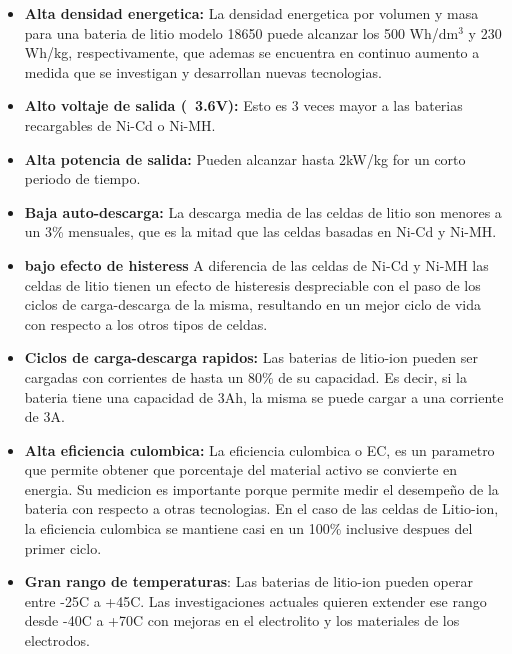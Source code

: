 \documentclass[10pt,a4paper]{article}
\begin{document}
	\begin{itemize}
        \item \textbf{Alta densidad energetica:} La densidad energetica por
            volumen y masa para una bateria de litio modelo 18650 puede alcanzar
            los 500 Wh/$\mathrm{dm^3}$ y 230 Wh/kg, respectivamente, que ademas
            se encuentra en continuo aumento a medida que se investigan y
            desarrollan nuevas tecnologias.
        \item \textbf{Alto voltaje de salida (~3.6V):} Esto es 3 veces mayor a
            las baterias recargables de Ni-Cd o Ni-MH.
        \item \textbf{Alta potencia de salida:} Pueden alcanzar hasta 2kW/kg for
            un corto periodo de tiempo.
        \item \textbf{Baja auto-descarga:} La descarga media de las celdas de
            litio son menores a un 3\% mensuales, que es la mitad que las celdas
            basadas en Ni-Cd y Ni-MH.
        \item \textbf{bajo efecto de histeress} A diferencia de las celdas de
            Ni-Cd y Ni-MH las celdas de litio tienen un efecto de histeresis
            despreciable con el paso de los ciclos de carga-descarga de la
            misma, resultando en un mejor ciclo de vida con respecto a los otros
            tipos de celdas.
        \item \textbf{Ciclos de carga-descarga rapidos:} Las baterias de
            litio-ion pueden ser cargadas con corrientes de hasta un 80\% de su
            capacidad. Es decir, si la bateria tiene una capacidad de 3Ah, la
            misma se puede cargar a una corriente de 3A.
        \item \textbf{Alta eficiencia culombica:} La eficiencia culombica o EC,
            es un parametro que permite obtener que porcentaje del material
            activo se convierte en energia. Su medicion es importante porque 
            permite medir el desempeño de la bateria con respecto a otras 
            tecnologias. En el caso de las celdas de Litio-ion, la eficiencia 
            culombica se mantiene casi en un 100\% inclusive despues del primer
            ciclo.
        \item \textbf{Gran rango de temperaturas}: Las baterias de litio-ion
            pueden operar entre -25\degreeCelsius C a +45\degreeCelsius C. Las
            investigaciones actuales quieren extender ese rango desde
            -40\degreeCelsius C a +70\degreeCelsius C con mejoras en el
            electrolito y los materiales de los electrodos.

\end{itemize}
\end{document}
